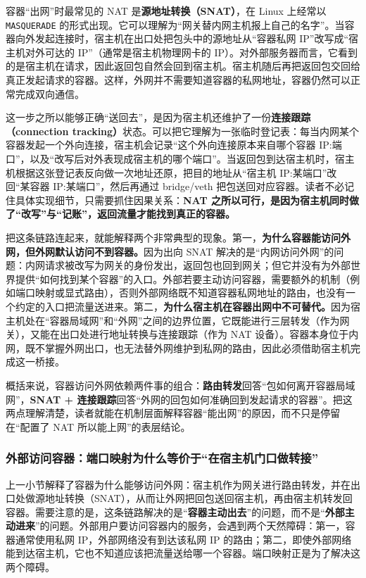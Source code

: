 容器“出网”时最常见的 NAT 是\textbf{源地址转换（SNAT）}，在 Linux 上经常以 \texttt{MASQUERADE} 的形式出现。它可以理解为“网关替内网主机报上自己的名字”。当容器向外发起连接时，宿主机在出口处把包头中的源地址从“容器私网 IP”改写成“宿主机对外可达的 IP”（通常是宿主机物理网卡的 IP）。对外部服务器而言，它看到的是宿主机在请求，因此返回包自然会回到宿主机。宿主机随后再把返回包交回给真正发起请求的容器。这样，外网并不需要知道容器的私网地址，容器仍然可以正常完成双向通信。

这一步之所以能够正确“送回去”，是因为宿主机还维护了一份\textbf{连接跟踪（connection tracking）}状态。可以把它理解为一张临时登记表：每当内网某个容器发起一个外向连接，宿主机会记录“这个外向连接原本来自哪个容器 IP:端口”，以及“改写后对外表现成宿主机的哪个端口”。当返回包到达宿主机时，宿主机根据这张登记表反向做一次地址还原，把目的地址从“宿主机 IP:某端口”改回“某容器 IP:某端口”，然后再通过 bridge/veth 把包送回对应容器。读者不必记住具体实现细节，只需要抓住因果关系：\textbf{NAT 之所以可行，是因为宿主机同时做了“改写”与“记账”，返回流量才能找到真正的容器。}

把这条链路连起来，就能解释两个非常典型的现象。第一，\textbf{为什么容器能访问外网，但外网默认访问不到容器。}因为出向 SNAT 解决的是“内网访问外网”的问题：内网请求被改写为网关的身份发出，返回包也回到网关；但它并没有为外部世界提供“如何找到某个容器”的入口。外部若要主动访问容器，需要额外的机制（例如端口映射或显式路由），否则外部网络既不知道容器私网地址的路由，也没有一个约定的入口把流量送进来。第二，\textbf{为什么宿主机在容器出网中不可替代。}因为宿主机处在“容器局域网”和“外网”之间的边界位置，它既能进行三层转发（作为网关），又能在出口处进行地址转换与连接跟踪（作为 NAT 设备）。容器本身位于内网，既不掌握外网出口，也无法替外网维护到私网的路由，因此必须借助宿主机完成这一桥接。

概括来说，容器访问外网依赖两件事的组合：\textbf{路由转发}回答“包如何离开容器局域网”，\textbf{SNAT + 连接跟踪}回答“外网的回包如何准确回到发起请求的容器”。把这两点理解清楚，读者就能在机制层面解释容器“能出网”的原因，而不只是停留在“配置了 NAT 所以能上网”的表层结论。


\subsubsection{外部访问容器：端口映射为什么等价于“在宿主机门口做转接”}

上一小节解释了容器为什么能够访问外网：宿主机作为网关进行路由转发，并在出口处做源地址转换（SNAT），从而让外网把回包送回宿主机，再由宿主机转发回容器。需要注意的是，这条链路解决的是“\textbf{容器主动出去}”的问题，而不是“\textbf{外部主动进来}”的问题。外部用户要访问容器内的服务，会遇到两个天然障碍：第一，容器通常使用私网 IP，外部网络没有到达该私网 IP 的路由；第二，即使外部网络能到达宿主机，它也不知道应该把流量送给哪一个容器。端口映射正是为了解决这两个障碍。

